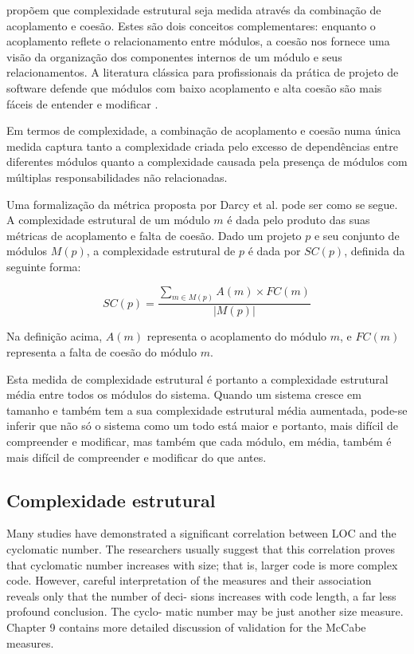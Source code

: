 \begin{itemize}
 propõem que
complexidade estrutural seja medida através da combinação de acoplamento
e coesão. Estes são dois conceitos complementares: enquanto o
acoplamento reflete o relacionamento entre módulos, a coesão nos fornece
uma visão da organização dos componentes internos de um módulo e seus
relacionamentos.  A literatura clássica para profissionais da prática de
projeto de software defende que módulos com baixo acoplamento e alta
coesão são mais fáceis de entender e modificar \cite{martin2003,
mcconnel2004}.

Em termos de complexidade, a combinação de acoplamento e coesão numa
única medida captura tanto a complexidade criada pelo excesso de
dependências entre diferentes módulos quanto a complexidade causada pela
presença de módulos com múltiplas responsabilidades não relacionadas.

Uma formalização da métrica proposta por Darcy et al.
\cite{darcy2005} pode ser como se segue. A complexidade estrutural de um
módulo $m$ é dada pelo produto das suas métricas de acoplamento e falta
de coesão. Dado um projeto $p$ e seu conjunto de módulos $M(p)$, a
complexidade estrutural de $p$ é dada por $SC(p)$, definida da seguinte
forma:

\[
SC(p) =
\frac
{\displaystyle\sum_{m \in M(p)}A(m) \times FC(m)}
{ |M(p)| }
\]

Na definição acima, $A(m)$ representa o acoplamento do módulo $m$, e
$FC(m)$ representa a falta de coesão do módulo $m$.

Esta medida de complexidade estrutural é portanto a complexidade
estrutural média entre todos os módulos do sistema. Quando um sistema
cresce em tamanho e também tem a sua complexidade estrutural média
aumentada, pode-se inferir que não só o sistema como um todo está maior
e portanto, mais difícil de compreender e modificar, mas também que cada
módulo, em média, também é mais difícil de compreender e modificar do
que antes.

\end{itemize}

\subsection{Complexidade estrutural} \label{complexidade}

Many studies have demonstrated a significant correlation between
LOC and the cyclomatic number. The researchers usually suggest that
this correlation proves that cyclomatic number increases with size; that
is, larger code is more complex code. However, careful interpretation of
the measures and their association reveals only that the number of deci-
sions increases with code length, a far less profound conclusion. The cyclo-
matic number may be just another size measure. Chapter 9 contains more
detailed discussion of validation for the McCabe measures.

